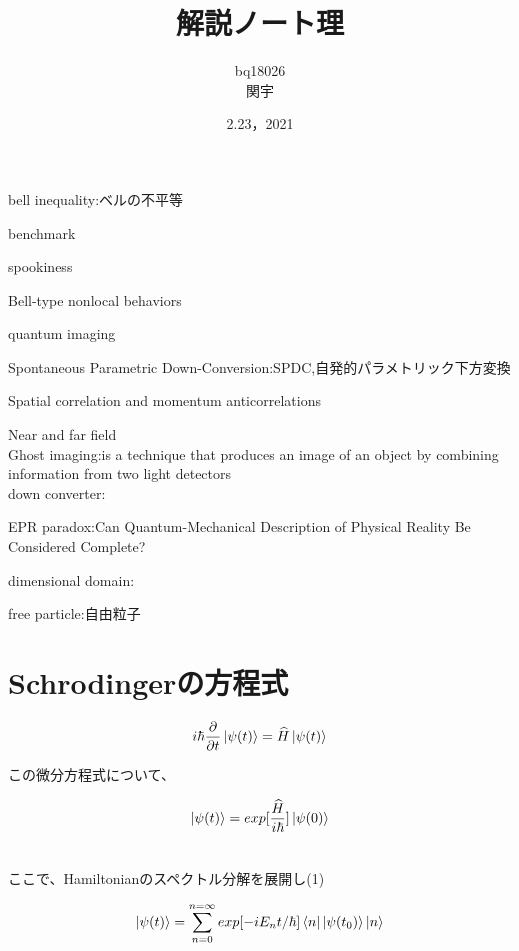 \documentclass[xelatex,ja=standard,jafont=noto]{bxjsarticle}
\title{解説ノート理}
\author{bq18026\\関宇}
\date{2.23，2021}
\begin{document}
\maketitle


bell inequality:ベルの不平等


benchmark

spookiness


Bell-type nonlocal behaviors

quantum imaging


Spontaneous Parametric Down-Conversion:SPDC,自発的パラメトリック下方変換

Spatial correlation and momentum anticorrelations


Near and far field\\

Ghost imaging:is a technique that produces an image of an object by combining information from two light detectors\\

down converter:


EPR paradox:Can Quantum-Mechanical Description of Physical Reality Be Considered Complete?

dimensional domain:

free particle:自由粒子

\newpage

\section{Schrodingerの方程式}

\begin{equation}
    i\hbar\frac{\partial}{\partial t}\ket{\psi(t)}=\widehat{H}\ket{\psi(t)}
\end{equation}

この微分方程式について、

\begin{equation}
    \begin{aligned}
      \ket{\psi(t)}&=exp[\frac{\widehat{H}}{i\hbar}]\ket{\psi(0)}\\
      \\
    \end{aligned}
\end{equation}

ここで、Hamiltonianのスペクトル分解を展開し(1)

\begin{equation}
    \ket{\psi(t)}=\sum_{n=0}^{n=\infty}exp[-iE_{n}t/\hbar]\bra{n}\ket{\psi(t_{0})}\ket{n}
\end{equation}
\end{document}
